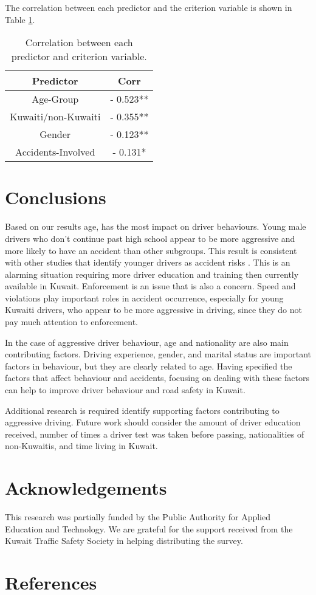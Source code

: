 \documentclass[preprint,12pt,a4paper,authoryear]{elsarticle}
\begin{document}
The correlation between each predictor and the criterion variable is shown in Table \ref{tab:corr}.

\begin{table}[H]
\centering
\caption{Correlation between each predictor and criterion variable.}
\label{tab:corr}
\begin{tabular}{@{}cc@{}}
\toprule
\textbf{Predictor} & \textbf{Corr} \\ \midrule
Age-Group & - 0.523** \\
Kuwaiti/non-Kuwaiti & - 0.355** \\
Gender & - 0.123** \\
Accidents-Involved & - 0.131* \\ \bottomrule
\end{tabular}
\end{table}

\section{Conclusions}
Based on our results age, has the most impact on driver behaviours. Young male drivers who don't continue past high school appear to be more aggressive and more likely to have an accident than other subgroups. This result is consistent with other studies that identify younger drivers as accident risks \citep{dewinters2010}. This is an alarming situation requiring more driver education and training then currently available in Kuwait. Enforcement is an issue that is also a concern. Speed and violations play important roles in accident occurrence, especially for young Kuwaiti drivers, who appear to be more aggressive in driving, since they do not pay much attention to enforcement. 

In the case of aggressive driver behaviour, age and nationality are also main contributing factors. Driving experience, gender, and marital status are important factors in behaviour, but they are clearly related to age. Having specified the factors that affect behaviour and accidents, focusing on dealing with these factors can help to improve driver behaviour and road safety in Kuwait.  

Additional research is required identify supporting factors contributing to aggressive driving. Future work should consider the amount of driver education received, number of times a driver test was taken before passing, nationalities of non-Kuwaitis, and time living in Kuwait.

\section{Acknowledgements}
This research was partially funded by the Public Authority for Applied Education and Technology. We are grateful for the support received from the Kuwait Traffic Safety Society in helping distributing the survey.
  
\section{References}

{}
%


\end{document}
